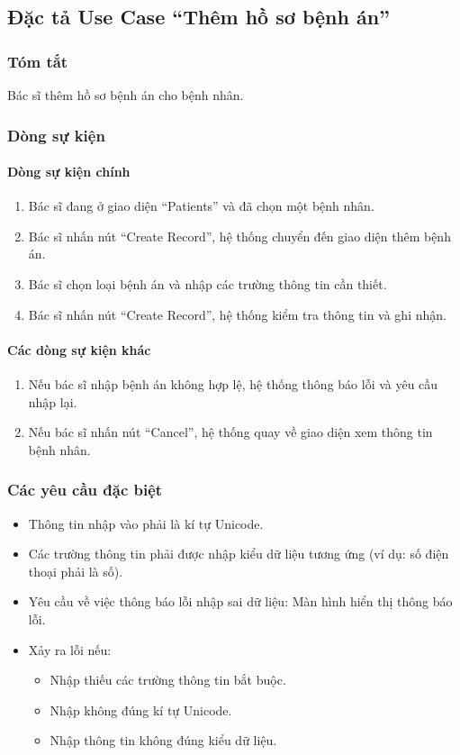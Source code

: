 \subsection{Đặc tả Use Case ``Thêm hồ sơ bệnh án''}

\subsubsection{Tóm tắt}
Bác sĩ thêm hồ sơ bệnh án cho bệnh nhân.

\subsubsection{Dòng sự kiện}
\paragraph{\textbf{Dòng sự kiện chính}}
\begin{enumerate}
  \item Bác sĩ đang ở giao diện ``Patients'' và đã chọn một bệnh nhân.
  \item Bác sĩ nhấn nút ``Create Record'', hệ thống chuyển đến giao diện thêm bệnh án.
  \item Bác sĩ chọn loại bệnh án và nhập các trường thông tin cần thiết.
  \item Bác sĩ nhấn nút ``Create Record'', hệ thống kiểm tra thông tin và ghi nhận.
\end{enumerate}

\paragraph{\textbf{Các dòng sự kiện khác}}
\begin{enumerate}
  \item Nếu bác sĩ nhập bệnh án không hợp lệ, hệ thống thông báo lỗi và yêu cầu nhập lại.
  \item Nếu bác sĩ nhấn nút ``Cancel'', hệ thống quay về giao diện xem thông tin bệnh nhân.
\end{enumerate}

\subsubsection{Các yêu cầu đặc biệt}
\begin{itemize}
  \item Thông tin nhập vào phải là kí tự Unicode.
  \item Các trường thông tin phải được nhập kiểu dữ liệu tương ứng (ví dụ: số điện thoại phải là số).
  \item Yêu cầu về việc thông báo lỗi nhập sai dữ liệu: Màn hình hiển thị thông báo lỗi.
  \item Xảy ra lỗi nếu:
    \begin{itemize}
      \item Nhập thiếu các trường thông tin bắt buộc.
      \item Nhập không đúng kí tự Unicode.
      \item Nhập thông tin không đúng kiểu dữ liệu.
    \end{itemize}
\end{itemize}


